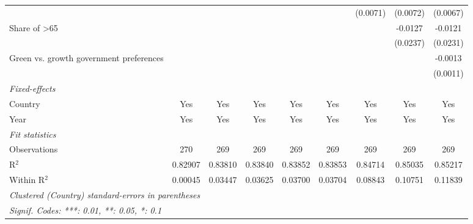 \begin{table}[htbp]
\begin{tabular}{lcccccccc}
                                                      &          &          &          &          &          & (0.0071) & (0.0072) & (0.0067)\\   
      Share of >65                                    &          &          &          &          &          &          & -0.0127  & -0.0121\\   
                                                      &          &          &          &          &          &          & (0.0237) & (0.0231)\\   
      Green vs. growth government preferences         &          &          &          &          &          &          &          & -0.0013\\   
                                                      &          &          &          &          &          &          &          & (0.0011)\\   
      \midrule
      \emph{Fixed-effects}\\
      Country                                         & Yes      & Yes      & Yes      & Yes      & Yes      & Yes      & Yes      & Yes\\  
      Year                                            & Yes      & Yes      & Yes      & Yes      & Yes      & Yes      & Yes      & Yes\\  
      \midrule
      \emph{Fit statistics}\\
      Observations                                    & 270      & 269      & 269      & 269      & 269      & 269      & 269      & 269\\  
      R$^2$                                           & 0.82907  & 0.83810  & 0.83840  & 0.83852  & 0.83853  & 0.84714  & 0.85035  & 0.85217\\  
      Within R$^2$                                    & 0.00045  & 0.03447  & 0.03625  & 0.03700  & 0.03704  & 0.08843  & 0.10751  & 0.11839\\  
      \midrule \midrule
      \multicolumn{9}{l}{\emph{Clustered (Country) standard-errors in parentheses}}\\
      \multicolumn{9}{l}{\emph{Signif. Codes: ***: 0.01, **: 0.05, *: 0.1}}\\
   \end{tabular}
\end{table}


